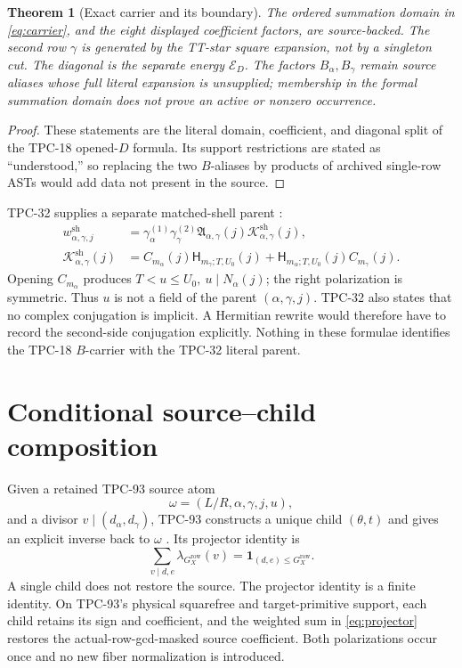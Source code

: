 \documentclass[11pt]{article}
\newtheorem{theorem}{Theorem}
\begin{document}
\begin{theorem}[Exact carrier and its boundary]
\label{thm:carrier}
The ordered summation domain in \eqref{eq:carrier}, and the eight displayed
coefficient factors, are source-backed.  The second row \(\gamma\) is
generated by the TT-star square expansion, not by a singleton cut.
The diagonal is the separate energy \(\mathcal E_D\).  The factors
\(B_\alpha,B_\gamma\) remain source aliases whose full literal expansion is
unsupplied; membership in the formal summation domain does not prove an
active or nonzero occurrence.
\end{theorem}

\begin{proof}
These statements are the literal domain, coefficient, and diagonal split of
the TPC-18 opened-\(D\) formula.  Its support restrictions are stated as
``understood,'' so replacing the two \(B\)-aliases by products of archived
single-row ASTs would add data not present in the source.
\end{proof}

TPC-32 supplies a separate matched-shell parent \citep{WangTPC32}:
\begin{align}
 w_{\alpha,\gamma,j}^{\mathrm{sh}}
 &=
 \gamma_\alpha^{(1)}\gamma_\gamma^{(2)}
 \mathfrak A_{\alpha,\gamma}(j)
 \mathcal K_{\alpha,\gamma}^{\mathrm{sh}}(j),\\
 \mathcal K_{\alpha,\gamma}^{\mathrm{sh}}(j)
 &=C_{m_\alpha}(j)\mathsf H_{m_\gamma;T,U_0}(j)
   +\mathsf H_{m_\alpha;T,U_0}(j)C_{m_\gamma}(j).
 \label{eq:polarization}
\end{align}
Opening \(C_{m_\alpha}\) produces
\(T<u\le U_0,\ u\mid N_\alpha(j)\); the right polarization is symmetric.
Thus \(u\) is not a field of the parent \((\alpha,\gamma,j)\).  TPC-32 also
states that no complex conjugation is implicit.  A Hermitian rewrite would
therefore have to record the second-side conjugation explicitly.  Nothing in
these formulae identifies the TPC-18 \(B\)-carrier with the TPC-32 literal
parent.

\section{Conditional source--child composition}

Given a retained TPC-93 source atom
\[
 \omega=(L/R,\alpha,\gamma,j,u),
\]
and a divisor \(v\mid(d_\alpha,d_\gamma)\), TPC-93 constructs a unique child
\((\theta,t)\) and gives an explicit inverse back to \(\omega\)
\citep{WangTPC93}.  Its projector identity is
\begin{equation}
 \sum_{v\mid d,e}\lambda_{G_X^{\mathrm{row}}}(v)
 =\mathbf 1_{(d,e)\le G_X^{\mathrm{row}}}.
 \label{eq:projector}
\end{equation}
A single child does not restore the source.  The projector identity is a
finite identity.  On TPC-93's physical squarefree and target-primitive
support, each child retains its sign and coefficient, and the weighted sum in
\eqref{eq:projector} restores the actual-row-gcd-masked source coefficient.
Both polarizations occur once and no new fiber normalization is introduced.
\end{document}
